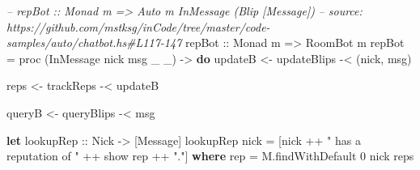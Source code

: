 \documentclass[]{article}
\newenvironment{Shaded}{}{}
\newcommand{\KeywordTok}[1]{\textcolor[rgb]{0.00,0.44,0.13}{\textbf{{#1}}}}
\newcommand{\DataTypeTok}[1]{\textcolor[rgb]{0.56,0.13,0.00}{{#1}}}
\newcommand{\DecValTok}[1]{\textcolor[rgb]{0.25,0.63,0.44}{{#1}}}
\newcommand{\StringTok}[1]{\textcolor[rgb]{0.25,0.44,0.63}{{#1}}}
\newcommand{\CommentTok}[1]{\textcolor[rgb]{0.38,0.63,0.69}{\textit{{#1}}}}
\newcommand{\OtherTok}[1]{\textcolor[rgb]{0.00,0.44,0.13}{{#1}}}
\newcommand{\FunctionTok}[1]{\textcolor[rgb]{0.02,0.16,0.49}{{#1}}}
\newcommand{\NormalTok}[1]{{#1}}
\begin{document}
\begin{Shaded}
\begin{Highlighting}[]
\CommentTok{-- repBot :: Monad m => Auto m InMessage (Blip [Message])}
\CommentTok{-- source: https://github.com/mstksg/inCode/tree/master/code-samples/auto/chatbot.hs#L117-147}
\OtherTok{repBot ::} \DataTypeTok{Monad} \NormalTok{m }\OtherTok{=>} \DataTypeTok{RoomBot} \NormalTok{m}
\NormalTok{repBot }\FunctionTok{=} \NormalTok{proc (}\DataTypeTok{InMessage} \NormalTok{nick msg _ _) }\OtherTok{->} \KeywordTok{do}
    \NormalTok{updateB }\OtherTok{<-} \NormalTok{updateBlips }\FunctionTok{-<} \NormalTok{(nick, msg)}

    \NormalTok{reps    }\OtherTok{<-} \NormalTok{trackReps   }\FunctionTok{-<} \NormalTok{updateB}

    \NormalTok{queryB  }\OtherTok{<-} \NormalTok{queryBlips  }\FunctionTok{-<} \NormalTok{msg}

    \KeywordTok{let}\OtherTok{ lookupRep ::} \DataTypeTok{Nick} \OtherTok{->} \NormalTok{[}\DataTypeTok{Message}\NormalTok{]}
        \NormalTok{lookupRep nick }\FunctionTok{=} \NormalTok{[nick }\FunctionTok{++} \StringTok{" has a reputation of "} \FunctionTok{++} \NormalTok{show rep }\FunctionTok{++} \StringTok{"."}\NormalTok{]}
          \KeywordTok{where}
            \NormalTok{rep }\FunctionTok{=} \NormalTok{M.findWithDefault }\DecValTok{0} \NormalTok{nick reps}


\end{Highlighting}
\end{Shaded}
\end{document}
